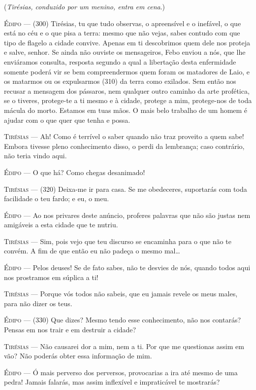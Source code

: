 (\emph{Tirésias, conduzido por um menino, entra em cena}.)

\textsc{Édipo} --- (300) Tirésias, tu que tudo observas, o apreensível e o inefável, o que
está no céu e o que pisa a terra: mesmo que não vejas, sabes contudo com
que tipo de flagelo a cidade convive. Apenas em ti descobrimos quem dele
nos proteja e salve, senhor. Se ainda não ouviste os mensageiros, Febo
enviou a nós, que lhe enviáramos consulta, resposta segundo a qual a
libertação desta enfermidade somente poderá vir se bem compreendermos
quem foram os matadores de Laio, e os matarmos ou os expulsarmos (310)
da terra como exilados. Sem então nos recusar a mensagem dos pássaros,
nem qualquer outro caminho da arte profética, se o tiveres, protege-te a
ti mesmo e à cidade, protege a mim, protege-nos de toda mácula do morto.
Estamos em tuas mãos. O mais belo trabalho de um homem é ajudar com o
que quer que tenha e possa.

\textsc{Tirésias} --- Ah! Como é terrível o saber quando não traz proveito a quem sabe! Embora
tivesse pleno conhecimento disso, o perdi da lembrança; caso contrário,
não teria vindo aqui.

\textsc{Édipo} --- O que há? Como chegas desanimado!

\textsc{Tirésias} --- (320) Deixa-me ir para casa. Se me obedeceres, suportarás com toda
facilidade o teu fardo; e eu, o meu.

\textsc{Édipo} --- Ao nos privares deste anúncio, proferes palavras que não são justas nem
amigáveis a esta cidade que te nutriu.

\textsc{Tirésias} --- Sim, pois vejo que teu discurso se encaminha para o que não te convém. A
fim de que então eu não padeça o mesmo mal\ldots{}

\textsc{Édipo} --- Pelos deuses! Se de fato sabes, não te desvies de nós, quando todos aqui
nos prostramos em súplica a ti!

\textsc{Tirésias} --- Porque vós todos não sabeis, que eu jamais revele os meus males, para
não dizer os teus.

\textsc{Édipo} --- (330) Que dizes? Mesmo tendo esse conhecimento, não nos contarás? Pensas
em nos trair e em destruir a cidade?

\textsc{Tirésias} --- Não causarei dor a mim, nem a ti. Por que me questionas assim em vão?
Não poderás obter essa informação de mim.

\textsc{Édipo} --- Ó mais perverso dos perversos, provocarias a ira até mesmo de uma pedra!
Jamais falarás, mas assim inflexível e impraticável te mostrarás?

